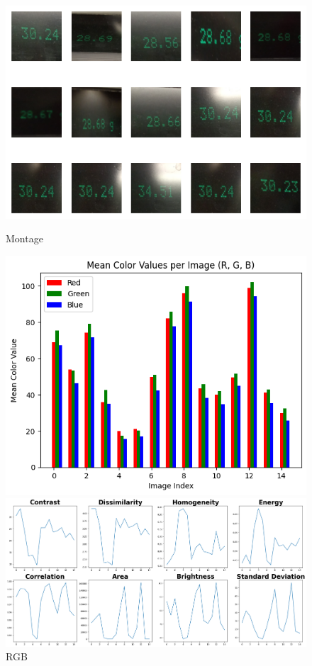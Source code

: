 \begin{figure}[ht]
    \centering
    \begin{minipage}[t]{0.25\textwidth}
        \centering
        \includegraphics[width=\textwidth]{Figures/EDA_Charts/8/montage.png}
        \caption*{Montage}
    \end{minipage}\hfill
    \begin{minipage}[t]{0.25\textwidth}
        \centering
        \includegraphics[width=\textwidth]{Figures/EDA_Charts/8/rgb.png}
        \caption*{RGB}
    \end{minipage}\hfill
    \begin{minipage}[t]{0.50\textwidth}
        \centering
        \includegraphics[width=\textwidth]{Figures/EDA_Charts/8/da.png}

\end{minipage}
\end{figure}
